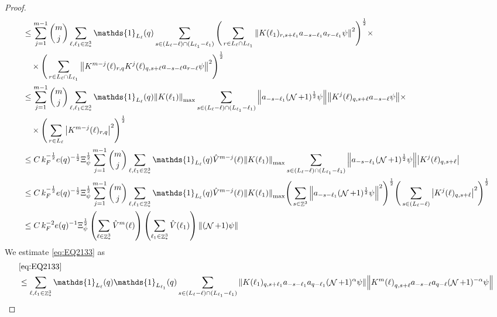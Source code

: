 \documentclass[sn-mathphys, Numbered ,a4paper]{sn-jnl}%
\DeclareMathOperator{\Z}{\mathbb{Z}}
\DeclareMathOperator{\NN}{\mathcal{N}}
\newcommand{\half}{\frac{1}{2}}
\newcommand{\normmax}[1]{\norm{#1}_{\mathrm{max}}}
\theoremstyle{plain}
\theoremstyle{definition}
\theoremstyle{remark}
\theoremstyle{plain}
\theoremstyle{definition}
\theoremstyle{remark}
\begin{document}
\begin{proof}
\begin{align}
		&\leq \sum\limits_{j=1}^{m-1} {{m}\choose j} \sum\limits_{\ell, \ell_1\in \Z^3_*} \mathds{1}_{L_{\ell}}(q) \sum\limits_{ s \in (L_{\ell}-\ell) \cap (L_{\ell_1}-\ell_1)}   \Bigg(\sum\limits_{r\in L_{\ell} \cap L_{\ell_1}} \norm{ K(\ell_1)_{r,s+\ell_1}a_{-s-\ell_1} a_{r-\ell_1} \psi}^2\Bigg)^\half\nonumber \times \\ &\quad \times\Bigg(  \sum\limits_{ r\in L_{\ell} \cap L_{\ell_1}}\norm{ K^{m-j}(\ell)_{r,q} K^{j}(\ell)_{q,s+\ell} a_{-s-\ell}a_{r-\ell} \psi }^2\Bigg)^\half\nonumber\\
		&\leq \sum\limits_{j=1}^{m-1} {{m}\choose j} \sum\limits_{\ell, \ell_1\in \Z^3_*} \mathds{1}_{L_{\ell}}(q) \normmax{K(\ell_1)}\sum\limits_{ s \in (L_{\ell}-\ell) \cap (L_{\ell_1}-\ell_1)}   \norm{ a_{-s-\ell_1} (\NN+1)^{\half} \psi} \norm{ K^{j}(\ell)_{q,s+\ell} a_{-s-\ell}  \psi }\nonumber \times \\&\quad \times\Bigg(  \sum\limits_{ r\in L_{\ell}}\abs{ K^{m-j}(\ell)_{r,q}}^2\Bigg)^\half \nonumber\\
		&\leq C\, k_F^{-\half} e(q)^{-\half} \Xi_{\psi}^{\half} \sum\limits_{j=1}^{m-1} {{m}\choose j} \sum\limits_{\ell, \ell_1\in \Z^3_*} \mathds{1}_{L_{\ell}}(q) \hat{V}^{m-j}(\ell)  \normmax{K(\ell_1)}\sum\limits_{ s \in (L_{\ell}-\ell) \cap (L_{\ell_1}-\ell_1)}   \norm{ a_{-s-\ell_1} (\NN+1)^{\half} \psi} \abs{ K^{j}(\ell)_{q,s+\ell} }\nonumber \\
		&\leq C\, k_F^{-\half} e(q)^{-\half} \Xi_{\psi}^{\half} \sum\limits_{j=1}^{m-1} {{m}\choose j} \sum\limits_{\ell, \ell_1\in \Z^3_*} \mathds{1}_{L_{\ell}}(q) \hat{V}^{m-j}(\ell)  \normmax{K(\ell_1)}\Bigg(\sum\limits_{ s \in\Z^3}  \norm{ a_{-s-\ell_1} (\NN+1)^{\half} \psi}^2\Bigg)^{\half}  \Bigg(\sum\limits_{ s \in (L_{\ell}-\ell) } \abs{ K^{j}(\ell)_{q,s+\ell} }^2\Bigg)^{\half}\nonumber \\
		&\leq C\, k_{F}^{-2} e(q)^{-1}  \Xi_{\psi}^\half \left(\sum\limits_{\ell\in \Z^3_*} \hat{V}^{m}(\ell) \right)\left(  \sum\limits_{ \ell_1\in \Z^3_*} \hat{V}(\ell_1)  \right) \norm{ (\NN+1) \psi}\label{eq:estEQ2132}
	\end{align} 
	We estimate \eqref{eq:EQ2133} as
	\begin{alignat}{2}
		&\eqref{eq:EQ2133}\nonumber\\
		&\leq \sum\limits_{\ell, \ell_1\in \Z^3_*} \mathds{1}_{L_{\ell}}(q) \mathds{1}_{L_{\ell_1}}(q) \sum\limits_{ s \in (L_{\ell}-\ell) \cap (L_{\ell_1}-\ell_1)} \norm{K(\ell_1)_{q,s+\ell_1} a_{-s-\ell_1} a_{q-\ell_1}  (\NN+1)^{\alpha}\psi}\norm{ K^m{(\ell)}_{q,s+\ell}  a_{-s-\ell} a_{q-\ell} (\NN+1)^{-\alpha} \psi } \nonumber\\

\end{alignat}
\end{proof}
\end{document}
